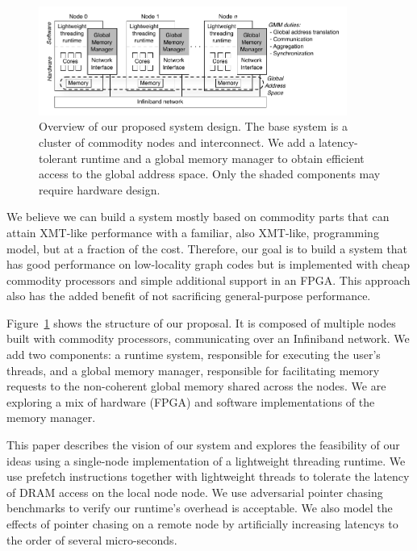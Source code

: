 \documentclass[10pt,nocopyrightspace,preprint]{sigplanconf}
\begin{document}
{%

\begin{figure}[htbp]
  \begin{center}
    \includegraphics[width=0.9\textwidth]{figures/system-overview.pdf}
	\end{center}
	\caption{Overview of our proposed system design. The base
          system is a cluster of commodity nodes and interconnect. We
          add a latency-tolerant runtime and a global memory manager
          to obtain efficient access to the global address space. Only
          the shaded components may require hardware design.}
	\label{fig:system-overview}
\end{figure}

We believe we can build a system mostly based on commodity parts that
can attain XMT-like performance with a familiar, also XMT-like,
programming model, but at a fraction of the cost. Therefore, our goal
is to build a system that has good performance on low-locality graph
codes but is implemented with cheap commodity processors and simple
additional support in an FPGA. This approach also has the added
benefit of not sacrificing general-purpose performance.

Figure~\ref{fig:system-overview} shows the structure of our
proposal. It is composed of multiple nodes built with commodity
processors, communicating over an Infiniband network. We add two
components: a runtime system, responsible for executing the user's
threads, and a global memory manager, responsible for facilitating
memory requests to the non-coherent global memory shared across the
nodes.  We are exploring a mix of hardware (FPGA) and software
implementations of the memory manager.

This paper describes the vision of our system and explores the
feasibility of our ideas using a single-node implementation of a
lightweight threading runtime. We use prefetch instructions together
with lightweight threads to tolerate the latency of DRAM access on the
local node node. We use adversarial pointer chasing benchmarks to
verify our runtime's overhead is acceptable. We also model the effects
of pointer chasing on a remote node by artificially increasing
latencys to the order of several micro-seconds.

}
\end{document}

